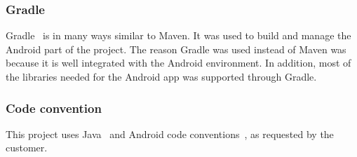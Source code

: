 \subsubsection{Gradle}
Gradle~\cite{gradle} is in many ways similar to Maven. It was used to build and manage the Android part of the project. The reason Gradle was used instead of Maven was because it is well integrated with the Android environment. In addition, most of the libraries needed for the Android app was supported through Gradle.

\subsubsection{Code convention}
This project uses Java~\cite{javaconv} and Android code conventions~\cite{androidconv}, as requested by the customer.
